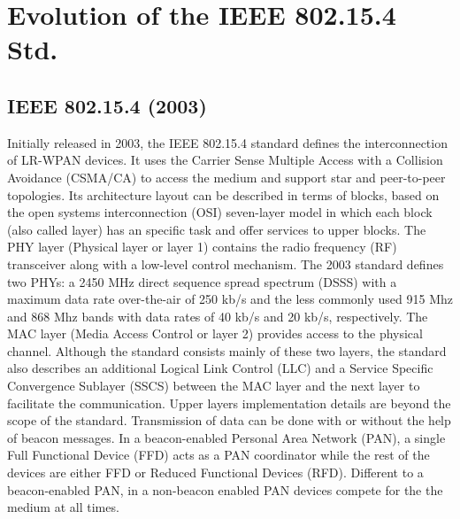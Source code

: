 \documentclass[conference]{IEEEtran}
\begin{document}
\section{Evolution of the IEEE 802.15.4 Std.} \label{evolutionStd}

\subsection{IEEE 802.15.4 (2003)}\label{wpan2003}

Initially released in 2003, the IEEE 802.15.4 standard \cite{std2003} defines the interconnection of LR-WPAN devices. It uses the Carrier Sense Multiple Access with a Collision Avoidance (CSMA/CA) to access the medium and support star and peer-to-peer topologies. Its architecture layout can be described in terms of blocks, based on the open systems interconnection (OSI) seven-layer model in which each block (also called layer) has an specific task and offer services to upper blocks. The PHY layer (Physical layer or layer 1) contains the radio frequency (RF) transceiver along with a low-level control mechanism. The 2003 standard defines two PHYs: a 2450 MHz direct sequence spread spectrum (DSSS) with a maximum data rate over-the-air of 250 kb/s and the less commonly used 915 Mhz and 868 Mhz bands with data rates of 40 kb/s and 20 kb/s, respectively. 
The MAC layer (Media Access Control or layer 2) provides access to the physical channel. Although the standard consists mainly of these two layers, the standard also describes an additional Logical Link Control (LLC) and a Service Specific Convergence Sublayer (SSCS) between the MAC layer and the next layer to facilitate the communication. Upper layers implementation details are beyond the scope of the standard. Transmission of data can be done with or without the help of beacon messages. In a beacon-enabled Personal Area Network (PAN), a single Full Functional Device (FFD) acts as a PAN coordinator while the rest of the devices are either FFD or Reduced Functional Devices (RFD). Different to a beacon-enabled PAN, in a non-beacon enabled PAN devices compete for the the medium at all times. 
\end{document}
